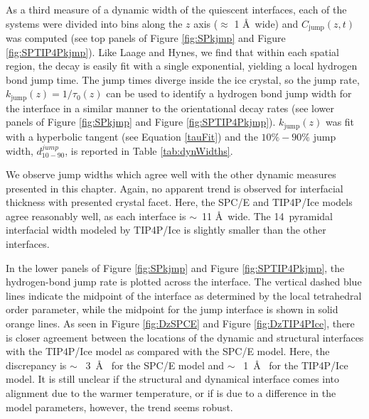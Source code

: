 As a third measure of a dynamic width of the quiescent
interfaces, each of the systems were divided into bins along the $z$
axis ($\approx$ 1 \AA\ wide) and $C_\mathrm{jump}(z,t)$ was computed
(see top panels of Figure \ref{fig:SPkjmp} and Figure
\ref{fig:SPTIP4Pkjmp}).  Like Laage and Hynes, we find that within
each spatial region, the decay is easily fit with a single
exponential, yielding a local hydrogen bond jump time. The jump times
diverge inside the ice crystal, so the jump rate,
$k_\mathrm{jump}(z) = 1 / \tau_0(z)$ can be used to identify a
hydrogen bond jump width for the interface in a similar manner to the
orientational decay rates (see lower panels of Figure \ref{fig:SPkjmp} and Figure
\ref{fig:SPTIP4Pkjmp}). $k_\mathrm{jump}(z)$ was fit with a hyperbolic
tangent (see Equation \eqref{tauFit}) and the $10\%-90\%$ jump width,
$d_\mathrm{10-90}^{jump}$, is reported in Table \ref{tab:dynWidths}.

We observe jump widths which agree well with the other dynamic
measures presented in this chapter. Again, no apparent trend is observed for
interfacial thickness with presented crystal facet. Here, the SPC/E
and TIP4P/Ice models agree reasonably well, as each interface is
$\sim$~11 \AA~wide. The 14\degree~pyramidal interfacial width modeled
by TIP4P/Ice is slightly smaller than the other interfaces.

In the lower panels of Figure \ref{fig:SPkjmp} and Figure
\ref{fig:SPTIP4Pkjmp}, the hydrogen-bond jump rate is plotted across
the interface. The vertical dashed blue lines indicate the midpoint of
the interface as determined by the local tetrahedral order parameter,
while the midpoint for the jump interface is shown in solid orange
lines. As seen in Figure \ref{fig:DzSPCE} and Figure
\ref{fig:DzTIP4PIce}, there is closer agreement between the locations
of the dynamic and structural interfaces with the TIP4P/Ice model as
compared with the SPC/E model. Here, the discrepancy is $\sim$~ 3~\AA~
for the SPC/E model and $\sim$~ 1~\AA~ for the TIP4P/Ice model. It is
still unclear if the structural and dynamical interface comes into
alignment due to the warmer temperature, or if is due to a difference
in the model parameters, however, the trend seems robust.

